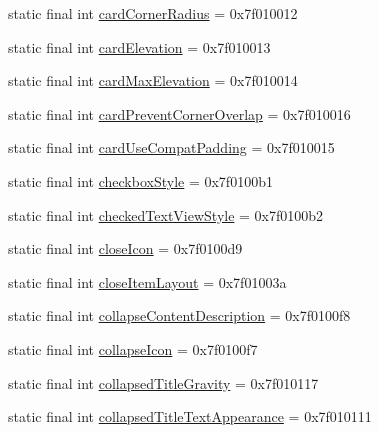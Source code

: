 \begin{CompactItemize}
static final int \hyperlink{classandroid_1_1support_1_1graphics_1_1drawable_1_1animated_1_1_r_1_1attr_f672cfb041ab4a8597fdbe74203b9032}{cardCornerRadius} = 0x7f010012
\item 
static final int \hyperlink{classandroid_1_1support_1_1graphics_1_1drawable_1_1animated_1_1_r_1_1attr_d2eee1d9b3112bef60388b80a8ff2d1c}{cardElevation} = 0x7f010013
\item 
static final int \hyperlink{classandroid_1_1support_1_1graphics_1_1drawable_1_1animated_1_1_r_1_1attr_13c52d1cb7813f40604ef8039bfd475f}{cardMaxElevation} = 0x7f010014
\item 
static final int \hyperlink{classandroid_1_1support_1_1graphics_1_1drawable_1_1animated_1_1_r_1_1attr_77616497e904a4f3da0f3c3350b47544}{cardPreventCornerOverlap} = 0x7f010016
\item 
static final int \hyperlink{classandroid_1_1support_1_1graphics_1_1drawable_1_1animated_1_1_r_1_1attr_9b8ee88055dd76f6ec4a3eb6ea010bc2}{cardUseCompatPadding} = 0x7f010015
\item 
static final int \hyperlink{classandroid_1_1support_1_1graphics_1_1drawable_1_1animated_1_1_r_1_1attr_f7650b81e5f9eae5e167c84d6f05a0b8}{checkboxStyle} = 0x7f0100b1
\item 
static final int \hyperlink{classandroid_1_1support_1_1graphics_1_1drawable_1_1animated_1_1_r_1_1attr_8985e38c901933d5122e5746ebdd8eab}{checkedTextViewStyle} = 0x7f0100b2
\item 
static final int \hyperlink{classandroid_1_1support_1_1graphics_1_1drawable_1_1animated_1_1_r_1_1attr_89877f1bac7cb71016b8d2861f01842d}{closeIcon} = 0x7f0100d9
\item 
static final int \hyperlink{classandroid_1_1support_1_1graphics_1_1drawable_1_1animated_1_1_r_1_1attr_0388c58bed05b38911e8ede76d18a0b7}{closeItemLayout} = 0x7f01003a
\item 
static final int \hyperlink{classandroid_1_1support_1_1graphics_1_1drawable_1_1animated_1_1_r_1_1attr_eb32a146bfc885539ed6355fa1ae2e7a}{collapseContentDescription} = 0x7f0100f8
\item 
static final int \hyperlink{classandroid_1_1support_1_1graphics_1_1drawable_1_1animated_1_1_r_1_1attr_e0c3e325857ce5ea1bc4d5abbca7ac43}{collapseIcon} = 0x7f0100f7
\item 
static final int \hyperlink{classandroid_1_1support_1_1graphics_1_1drawable_1_1animated_1_1_r_1_1attr_ef1beb0c4bd13691d0ec39294b3b0f2c}{collapsedTitleGravity} = 0x7f010117
\item 
static final int \hyperlink{classandroid_1_1support_1_1graphics_1_1drawable_1_1animated_1_1_r_1_1attr_2b27485554bac413619a9108a2be85af}{collapsedTitleTextAppearance} = 0x7f010111

\end{CompactItemize}
